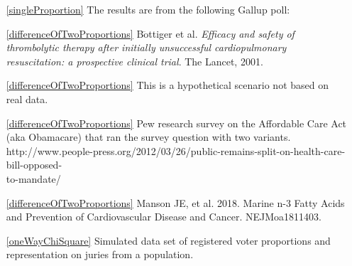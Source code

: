 \begin{itemize}
\item[\ref{singleProportion}]
    The results are from the following Gallup poll:\\

\item[\ref{differenceOfTwoProportions}]
    B$\ddot{\text{o}}$ttiger et al.
    \emph{Efficacy and safety of thrombolytic therapy after
        initially unsuccessful cardiopulmonary resuscitation:
        a prospective clinical trial}.
        The Lancet, 2001.

\item[\ref{differenceOfTwoProportions}]
    This is a hypothetical scenario not based on real data.

\item[\ref{differenceOfTwoProportions}]
    Pew research survey on the Affordable Care Act (aka Obamacare)
    that ran the survey question with two variants.\\
        {http://www.people-press.org/2012/03/26/public-remains-split-on-health-care-bill-opposed-\\
        to-mandate/}

\item[\ref{differenceOfTwoProportions}]
    Manson JE, et al. 2018.
    Marine n-3 Fatty Acids and Prevention of
    Cardiovascular Disease and Cancer. NEJMoa1811403.



\item[\ref{oneWayChiSquare}]
    Simulated data set of registered voter proportions
    and representation on juries from a population.


\end{itemize}
